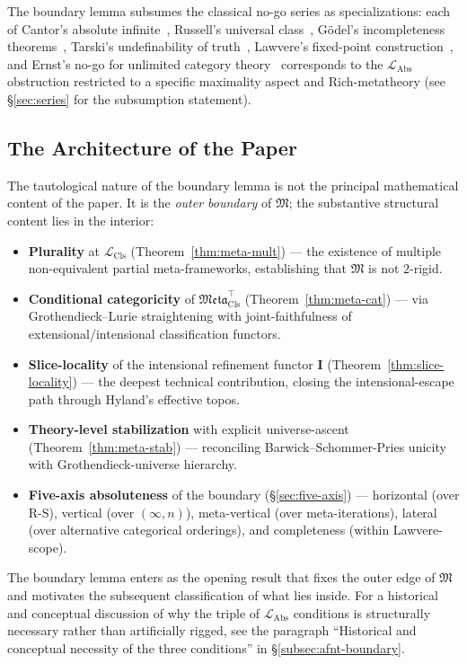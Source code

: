 \documentclass[11pt]{article}
\theoremstyle{plain}
\theoremstyle{definition}
\newcommand{\RS}{\mathrm{R\text{-}S}}
\newcommand{\fM}{\mathfrak{M}}
\newcommand{\Meta}{\mathfrak{Meta}}
\newcommand{\LCls}{\mathcal{L}_{\mathrm{Cls}}}
\newcommand{\LAbs}{\mathcal{L}_{\mathrm{Abs}}}
\newcommand{\II}{\mathbf{I}}
\begin{document}
The boundary lemma subsumes the classical no-go series as specializations: each of Cantor's absolute infinite~\cite{Cantor1891}, Russell's universal class~\cite{Russell1903}, G\"odel's incompleteness theorems~\cite{Godel1931}, Tarski's undefinability of truth~\cite{Tarski1936}, Lawvere's fixed-point construction~\cite{Lawvere1969}, and Ernst's no-go for unlimited category theory~\cite{Ernst2015} corresponds to the $\LAbs$ obstruction restricted to a specific maximality aspect and Rich-metatheory (see \S\ref{sec:series} for the subsumption statement).

\subsection{The Architecture of the Paper}

The tautological nature of the boundary lemma is not the principal mathematical content of the paper. It is the \emph{outer boundary} of $\fM$; the substantive structural content lies in the interior:
\begin{itemize}
\item \textbf{Plurality} at $\LCls$ (Theorem~\ref{thm:meta-mult}) --- the existence of multiple non-equivalent partial meta-frameworks, establishing that $\fM$ is not $2$-rigid.
\item \textbf{Conditional categoricity} of $\Meta_{\mathrm{Cls}}^{\top}$ (Theorem~\ref{thm:meta-cat}) --- via Grothendieck--Lurie straightening with joint-faithfulness of extensional/intensional classification functors.
\item \textbf{Slice-locality} of the intensional refinement functor $\II$ (Theorem~\ref{thm:slice-locality}) --- the deepest technical contribution, closing the intensional-escape path through Hyland's effective topos.
\item \textbf{Theory-level stabilization} with explicit universe-ascent (Theorem~\ref{thm:meta-stab}) --- reconciling Barwick--Schommer-Pries unicity with Grothendieck-universe hierarchy.
\item \textbf{Five-axis absoluteness} of the boundary (\S\ref{sec:five-axis}) --- horizontal (over $\RS$), vertical (over $(\infty, n)$), meta-vertical (over meta-iterations), lateral (over alternative categorical orderings), and completeness (within Lawvere-scope).
\end{itemize}
The boundary lemma enters as the opening result that fixes the outer edge of $\fM$ and motivates the subsequent classification of what lies inside. For a historical and conceptual discussion of why the triple of $\LAbs$ conditions is structurally necessary rather than artificially rigged, see the paragraph ``Historical and conceptual necessity of the three conditions'' in \S\ref{subsec:afnt-boundary}.
\end{document}
